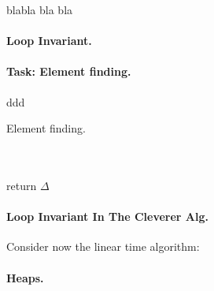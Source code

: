 blabla bla bla

\paragraph{Loop Invariant.}


\paragraph{Task: Element finding.} ddd

\begin{algbox}{Element finding.}
\begin{algorithm}[H]
{}
 \ \\ 
  { 
        \ \\ 
    } 
    return \( \Delta \) 
\end{algorithm}
\end{algbox}

\paragraph{Loop Invariant In The Cleverer Alg.} Consider now the linear time algorithm:



\paragraph{Heaps.}




